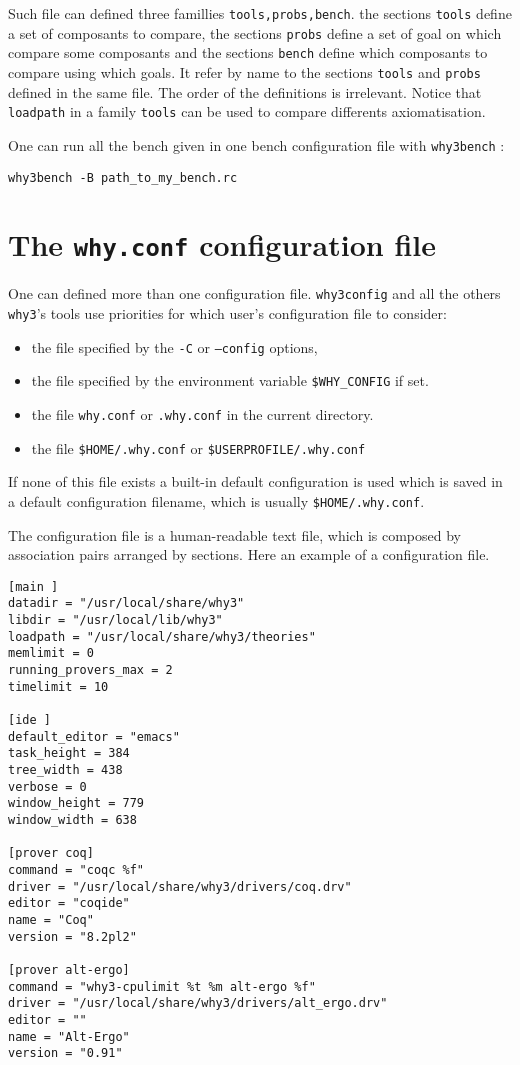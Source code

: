 Such file can defined three famillies \texttt{tools,probs,bench}. the
sections \texttt{tools} define a set of composants to compare, the
sections \texttt{probs} define a set of goal on which compare some
composants and the sections \texttt{bench} define which composants to
compare using which goals. It refer by name to the sections
\texttt{tools} and \texttt{probs} defined in the same file. The order
of the definitions is irrelevant. Notice that \texttt{loadpath} in a family
\texttt{tools} can be used to compare differents axiomatisation.

One can run all the bench given in one bench configuration file with
\texttt{why3bench} :
\begin{verbatim}
why3bench -B path_to_my_bench.rc
\end{verbatim}

\section{The \texttt{why.conf} configuration file}
\label{sec:whyconffile}
One can defined more than one configuration file. \texttt{why3config}
and all the others \texttt{why3}'s tools use priorities for which
user's configuration file to consider:
\begin{itemize}
\item the file specified by the \texttt{-C} or \texttt{--config} options,
\item the file specified by the environment variable
  \texttt{\$WHY\_CONFIG} if set.
\item the file \texttt{why.conf} or \texttt{.why.conf} in the current
  directory.
\item the file \texttt{\$HOME/.why.conf} or \texttt{\$USERPROFILE/.why.conf}
\end{itemize}
If none of this file exists a built-in default configuration is used
which is saved in a default configuration filename, which is usually
\texttt{\$HOME/.why.conf}.

The configuration file is a human-readable text file, which is
composed by association pairs arranged by sections. Here an example of
a configuration file.

\begin{verbatim}
[main ]
datadir = "/usr/local/share/why3"
libdir = "/usr/local/lib/why3"
loadpath = "/usr/local/share/why3/theories"
memlimit = 0
running_provers_max = 2
timelimit = 10

[ide ]
default_editor = "emacs"
task_height = 384
tree_width = 438
verbose = 0
window_height = 779
window_width = 638

[prover coq]
command = "coqc %f"
driver = "/usr/local/share/why3/drivers/coq.drv"
editor = "coqide"
name = "Coq"
version = "8.2pl2"

[prover alt-ergo]
command = "why3-cpulimit %t %m alt-ergo %f"
driver = "/usr/local/share/why3/drivers/alt_ergo.drv"
editor = ""
name = "Alt-Ergo"
version = "0.91"
\end{verbatim}

